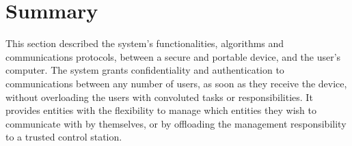 


\section{Summary}\label{chap:arch:summary}

This section described the system's functionalities, algorithms and communications protocols, between a secure and portable device, and the user's computer.
The system grants confidentiality and authentication to communications between any number of users, as soon as they receive the device, without overloading the users with convoluted tasks or responsibilities.
It provides entities with the flexibility to manage which entities they wish to communicate with by themselves, or by offloading the management responsibility to a trusted control station.
